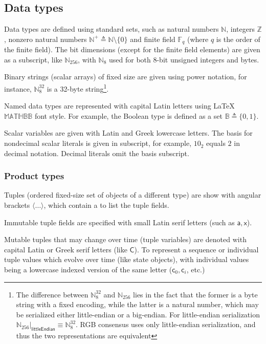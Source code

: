 \documentclass[9pt,oneside]{amsart}
\begin{document}
\begin{multicols}{2}
\subsection{Data types}

Data types are defined using standard sets, such as
natural numbers $\mathbb{N}$, integers $\mathbb{Z}$,
nonzero natural numbers $\mathbb{N}^+ \triangleq \mathbb{N}\setminus\{0\}$
and finite field $\mathbb{F}_q$ (where $q$ is the order of the finite field).
The bit dimensions (except for the finite field elements) are given as a subscript,
like $\mathbb{N}_{256}$, with $\mathbb{N}_8$ used for both 8-bit unsigned integers and bytes.

Binary strings (scalar arrays) of fixed size are given using power notation,
for instance, $\mathbb{N}_8^{32}$ is a 32-byte string\footnote{
The difference between $\mathbb{N}_8^{32}$ and $\mathbb{N}_{256}$ lies in the fact that
the former is a byte string with a fixed encoding,
while the latter is a natural number, which may be serialized either
little-endian or a big-endian.
For little-endian serialization $\mathbb{N}_{256}|_\mathsf{littleEndian} \equiv \mathbb{N}_8^{32}$.
RGB consensus uses only little-endian serialization,
and thus the two representations are equivalent}.

Named data types are represented with capital Latin letters using \LaTeX\ $\mathbb{MATHBB}$ font style.
For example, the Boolean type is defined as a set $\mathbb{B} \triangleq \{0, 1\}$.

Scalar variables are given with Latin and Greek lowercase letters.
The basis for nondecimal scalar literals is given in subscript,
for example, $10_2$ equals $2$ in decimal notation. Decimal literals omit the basis subscript.

\subsubsection{Product types}

Tuples (ordered fixed-size set of objects of a different type)
are show with angular brackets $\langle \ldots \rangle$,
which contain a to list the tuple fields.

Immutable tuple fields are specified with small Latin serif letters
(such as $\mathsf{a}, \mathsf{x}$).

Mutable tuples that may change over time (tuple variables) are denoted
with capital Latin or Greek serif letters (like $\mathsf{C}$). To represent
a sequence or individual tuple values which evolve over time (like state objects),
with individual values being a lowercase indexed version of the same letter
($\mathsf{c}_0, \mathsf{c}_i$, etc.)


\end{multicols}
\end{document}
